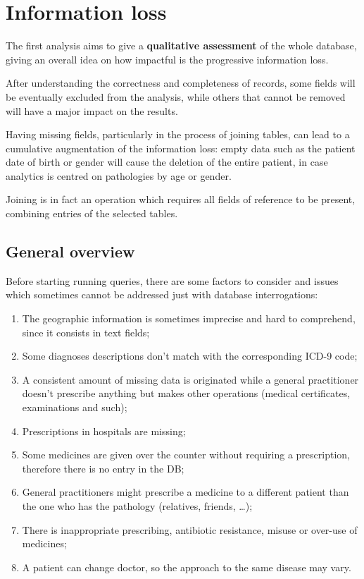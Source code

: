 \chapter{Information loss} %
The first analysis aims to give a \textbf{qualitative assessment} of the whole database, giving an overall idea on how impactful is the progressive information loss. 

After understanding the correctness and completeness of records, some fields will be eventually excluded from the analysis, while others that cannot be removed will have a major impact on the results.

Having missing fields, particularly in the process of joining tables, can lead to a cumulative augmentation of the information loss: empty data such as the patient date of birth or gender will cause the deletion of the entire patient, in case analytics is centred on pathologies by age or gender.

Joining is in fact an operation which requires all fields of reference to be present, combining entries of the selected tables\cite{DC2}.

\section{General overview}
Before starting running queries, there are some factors to consider and issues which sometimes cannot be addressed just with database interrogations:
\begin{enumerate}
	\item The geographic information is sometimes imprecise and hard to comprehend, since it consists in text fields;
	\item Some diagnoses descriptions don't match with the corresponding ICD-9 code;
	\item A consistent amount of missing data is originated while a general practitioner doesn't prescribe anything but makes other operations (medical certificates, examinations and such);
	\item Prescriptions in hospitals are missing;
	\item Some medicines are given over the counter without requiring a prescription, therefore there is no entry in the DB;
	\item General practitioners might prescribe a medicine to a different patient than the one who has the pathology (relatives, friends, \dots);
	\item There is inappropriate prescribing, antibiotic resistance, misuse or over-use of medicines;
	\item A patient can change doctor, so the approach to the same disease may vary.
\end{enumerate}

